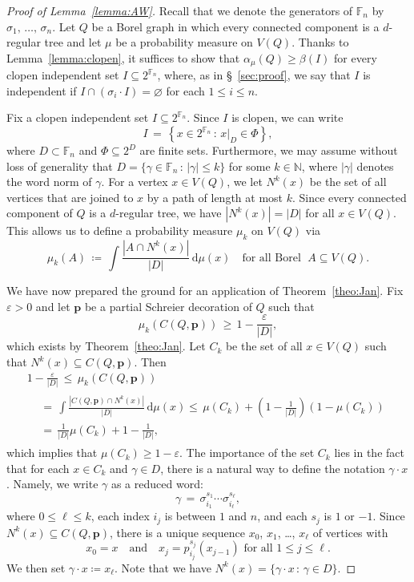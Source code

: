 \documentclass[AHL,Unicode,longabstracts,published]{cedram}
\newcommand{\0}{\varnothing}
\newcommand{\set}[1]{\{#1\}}
\renewcommand{\epsilon}{\varepsilon}
\renewcommand{\leq}{\leqslant}
\renewcommand{\geq}{\geqslant}
\newcommand{\defeq}{\coloneqq}
\newcommand{\rest}[2]{{{#1}\vert_{#2}}}
\newcommand{\N}{{\mathbb{N}}}
\newcommand{\F}{\mathbb{F}}
\newcommand{\rmd}{\mathrm{d}}
\begin{document}
\begin{proof}[{Proof of Lemma~\ref{lemma:AW}}]
Recall that we denote the generators of $\F_n$ by $\sigma_1,\, \ldots, \,\sigma_n$. Let $Q$ be a Borel graph in which every connected component is a $d$-regular tree and let $\mu$ be a probability measure on $V(Q)$. Thanks to Lemma~\ref{lemma:clopen}, it suffices to show that $\alpha_\mu(Q) \geq \beta(I)$ for every clopen independent set $I \subseteq 2^{\F_n}$, where, as in \S~\ref{sec:proof}, we say that $I$ is independent if $I \cap (\sigma_i \cdot I) = \0$ for each $1 \leq i \leq n$.

Fix a clopen independent set $I \subseteq 2^{\F_n}$. Since $I$ is clopen, we can write
\[
I \,=\, \left\{x \in 2^{\F_n} \,:\, \rest{x}{D} \in \Phi\right\},
\]
where $D \subset \F_n$ and $\Phi \subseteq 2^D$ are finite sets. Furthermore, we may assume without loss of generality that $D = \set{\gamma \in \F_n \,:\, |\gamma| \leq k}$ for some $k \in \N$, where $|\gamma|$ denotes the word norm of $\gamma$. For a vertex $x \in V(Q)$, we let $N^k(x)$ be the set of all vertices that are joined to $x$ by a path of length at most $k$. Since every connected component of $Q$ is a $d$-regular tree, we have $|N^k(x)| = |D|$ for all $x \in V(Q)$. This allows us to define a probability measure $\mu_k$ on $V(Q)$ via
\[
\mu_k(A) \,
\defeq\, \int \frac{\left|A \cap N^k(x)\right|}{|D|} \,\rmd\mu(x) \quad \text{for all Borel }\; A \subseteq V(Q).
\]

We have now prepared the ground for an application of Theorem~\ref{theo:Jan}. Fix $\epsilon > 0$ and let $\bm{p}$ be a partial Schreier decoration of $Q$ such that
\[
\mu_k(C(Q, \bm{p})) \,\geq\, 1 - \frac{\epsilon}{|D|},
\]
which exists by Theorem~\ref{theo:Jan}. Let $C_k$ be the set of all $x \in V(Q)$ such that $N^k(x) \subseteq C(Q, \bm{p})$. Then
\begin{multline*}
1 - \frac{\epsilon}{|D|} \,\leq\, \mu_k\left(C\left(Q, \bm{p}\right)\right) \\
\begin{aligned}
&=\, \int \frac{\left|C\left(Q, \bm{p}\right) \cap N^k(x)\right|}{|D|} \,\rmd\mu(x)
\leq\, \mu(C_k) + \left(1 - \frac{1}{|D|}\right)\left(1 - \mu\left(C_k\right)\right)\\
&=\, \frac{1}{|D|} \mu(C_k) + 1 - \frac{1}{|D|},
\end{aligned}
\end{multline*}
which implies that $\mu(C_k) \geq 1 - \epsilon$. The importance of the set $C_k$ lies in the fact that for each $x \in C_k$ and $\gamma \in D$, there is a natural way to define the notation $\gamma \cdot x$. Namely, we write $\gamma$ as a reduced word:
\[
\gamma \,=\, \sigma_{i_1}^{s_1} \cdots \sigma_{i_\ell}^{s_\ell},
\]
where $0 \leq \ell \leq k$, each index $i_j$ is between $1$ and $n$, and each $s_j$ is $1$ or $-1$. Since $N^k(x) \subseteq C(Q, \bm{p})$, there is a unique sequence $x_0$, $x_1$, \ldots, $x_\ell$ of vertices with
\[
x_0 = x \quad \text{and} \quad x_{j} = p_{i_j}^{s_j}\left(x_{j-1}\right) \text{ for all } 1 \leq j \leq \ell.
\]
We then set $\gamma \cdot x
\defeq x_\ell$. Note that we have $N^k(x) = \set{\gamma \cdot x \,:\, \gamma \in D}$.


\end{proof}
\end{document}
